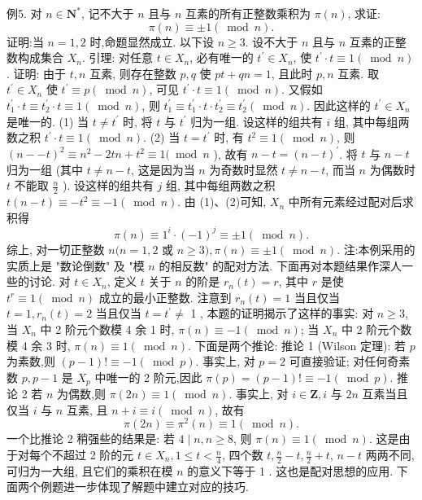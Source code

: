 例5. 对 $n \in \mathbf{N}^*$, 记不大于 $n$ 且与 $n$ 互素的所有正整数乘积为 $\pi(n)$, 求证:
$$
\pi(n) \equiv \pm 1(\bmod n) .
$$
证明:当 $n=1,2$ 时,命题显然成立.
以下设 $n \geqslant 3$.
设不大于 $n$ 且与 $n$ 互素的正整数构成集合 $X_n$.
引理: 对任意 $t \in X_n$, 必有唯一的 $t^{\prime} \in X_n$, 使 $t^{\prime} \cdot t \equiv 1(\bmod n)$.
证明: 由于 $t, n$ 互素, 则存在整数 $p, q$ 使 $p t+q n=1$, 且此时 $p, n$ 互素.
取 $t^{\prime} \in X_n$ 使 $t^{\prime} \equiv p(\bmod n)$, 可见 $t^{\prime} \cdot t \equiv 1(\bmod n)$. 又假如 $t_1^{\prime} \cdot t \equiv t_2^{\prime} \cdot t \equiv 1(\bmod n)$, 则 $t_1^{\prime} \equiv t_1^{\prime} \cdot t \cdot t_2^{\prime} \equiv t_2^{\prime}(\bmod n)$. 因此这样的 $t^{\prime} \in X_n$ 是唯一的.
(1) 当 $t \neq t^{\prime}$ 时, 将 $t$ 与 $t^{\prime}$ 归为一组.
设这样的组共有 $i$ 组, 其中每组两数之积 $t^{\prime} \cdot t \equiv 1(\bmod n)$.
(2) 当 $t=t^{\prime}$ 时, 有 $t^2 \equiv 1(\bmod n)$, 则 $(n--t)^2 \equiv n^2-2 t n+t^2 \equiv 1(\bmod n$ ), 故有 $n-t=(n-t)^{\prime}$. 将 $t$ 与 $n-t$ 归为一组 (其中 $t \neq n-t$, 这是因为当 $n$ 为奇数时显然 $t \neq n-t$, 而当 $n$ 为偶数时 $t$ 不能取 $\frac{n}{2}$ ). 设这样的组共有 $j$ 组, 其中每组两数之积 $t(n-t) \equiv-t^2 \equiv-1(\bmod n)$.
由 (1)、(2)可知, $X_n$ 中所有元素经过配对后求积得
$$
\pi(n) \equiv 1^i \cdot(-1)^j \equiv \pm 1(\bmod n) .
$$
综上, 对一切正整数 $n(n=1,2$ 或 $n \geqslant 3), \pi(n) \equiv \pm 1(\bmod n)$.
注:本例采用的实质上是 "数论倒数" 及 "模 $n$ 的相反数" 的配对方法.
下面再对本题结果作深人一些的讨论.
对 $t \in X_n$, 定义 $t$ 关于 $n$ 的阶是 $r_n(t)=r$, 其中 $r$ 是使 $t^r \equiv 1(\bmod n)$ 成立的最小正整数.
注意到 $r_n(t)=1$ 当且仅当 $t=1, r_n(t)=2$ 当且仅当 $t=t^{\prime} \neq$ 1 , 本题的证明揭示了这样的事实: 对 $n \geqslant 3$, 当 $X_n$ 中 2 阶元个数模 4 余 1 时, $\pi(n) \equiv-1(\bmod n)$; 当 $X_n$ 中 2 阶元个数模 4 余 3 时, $\pi(n) \equiv 1(\bmod n)$. 下面是两个推论:
推论 1 (Wilson 定理): 若 $p$ 为素数,则 $(p-1) ! \equiv-1(\bmod p)$.
事实上, 对 $p=2$ 可直接验证; 对任何奇素数 $p, p-1$ 是 $X_p$ 中唯一的 2 阶元,因此 $\pi(p)=(p-1) ! \equiv-1(\bmod p)$.
推论 2 若 $n$ 为偶数,则 $\pi(2 n) \equiv 1(\bmod n)$.
事实上, 对 $i \in \mathbf{Z}, i$ 与 $2 n$ 互素当且仅当 $i$ 与 $n$ 互素, 且 $n+i \equiv i(\bmod n)$, 故有
$$
\pi(2 n) \equiv \pi^2(n) \equiv 1(\bmod n) .
$$
一个比推论 2 稍强些的结果是: 若 $4 \mid n, n \geqslant 8$, 则 $\pi(n) \equiv 1(\bmod n)$. 这是由于对每个不超过 2 阶的元 $t \in X_n, 1 \leqslant t<\frac{n}{4}$, 四个数 $t, \frac{n}{2}-t, \frac{n}{2}+t$, $n-t$ 两两不同, 可归为一大组, 且它们的乘积在模 $n$ 的意义下等于 1 . 这也是配对思想的应用.
下面两个例题进一步体现了解题中建立对应的技巧.



